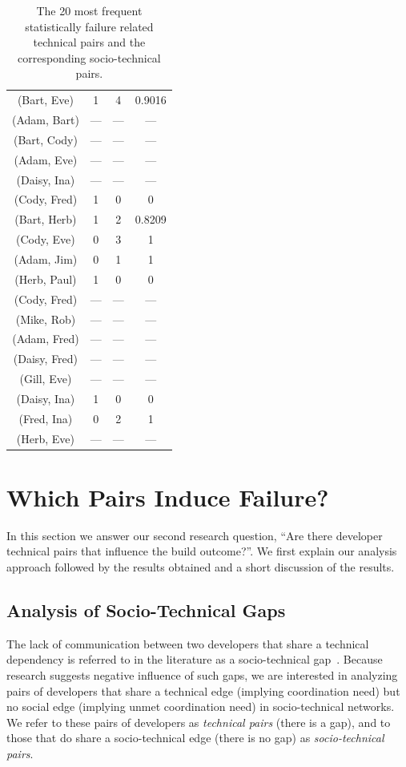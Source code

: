 \documentclass[12pt,oneside]{book}
\begin{document}
\begin{table}[t]
{\begin{tabular}{@{\hspace{.2cm}}ccc@{\hspace{.75cm}}c@{\hspace{.2cm}}}
(Bart, Eve)	&	1&	4&	0.9016\\
(Adam, Bart)	&	---&	---&	---\\
(Bart, Cody)	&	---&	---&	---\\
(Adam, Eve)	&	---&	---&	---\\
(Daisy, Ina)	&	---&	---&	---\\
(Cody, Fred)	&	1&	0&	0\\
(Bart, Herb)	&	1&	2&	0.8209\\
(Cody, Eve)	&	0&	3&	1\\
(Adam, Jim)	&	0&	1&	1\\
(Herb, Paul)	&	1&	0&	0\\
(Cody, Fred)	&	---&	---&	---\\
(Mike, Rob)	&	---&	---&	---\\
(Adam, Fred)	&	---&	---&	---\\
(Daisy, Fred)	&	---&	---&	---\\
(Gill, Eve)		&	---&	---&	---\\
(Daisy, Ina)	&	1&	0&	0\\
(Fred, Ina)	&	0&	2&	1\\
(Herb, Eve)	&	---&	---&	---\\
\bottomrule
\end{tabular}
\label{tab:stechpairs}
}
\caption{The 20 most frequent statistically failure related technical pairs and the corresponding socio-technical pairs.}
\label{tab:pairs}
\end{table}
\addtocounter{table}{-1}




\section{Which Pairs Induce Failure?}
\label{sec:pattern}
In this section we answer our second research question, ``Are there
developer technical pairs that influence the build outcome?''. 
We first explain our analysis approach followed by the results obtained and a
short discussion of the results.

\subsection{Analysis of Socio-Technical Gaps}
The lack of communication between two developers that share a
technical dependency is referred to in the literature as a
socio-technical gap~\cite{valetto:msr:2007}. Because research suggests negative influence of such gaps, we are interested in analyzing pairs of developers that share a technical edge (implying coordination need) but no social edge (implying
unmet coordination need) in socio-technical networks. We refer to these pairs of
developers as \emph{technical pairs} (there is a gap), and to those that do
share a socio-technical edge (there is no gap) as \emph{socio-technical pairs}. 
\end{document}
